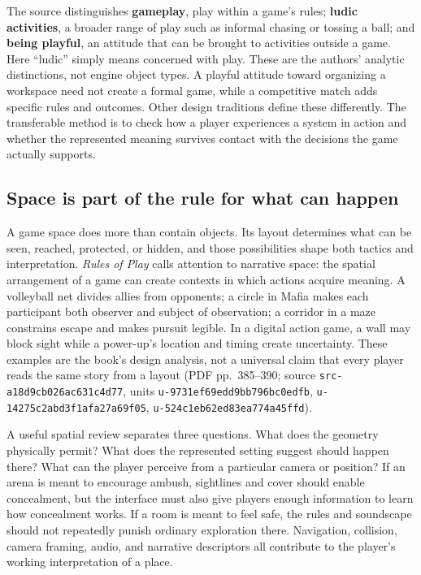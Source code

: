 The source distinguishes \textbf{gameplay}, play within a game's rules; \textbf{ludic activities}, a broader range of play such as informal chasing or tossing a ball; and \textbf{being playful}, an attitude that can be brought to activities outside a game. Here ``ludic'' simply means concerned with play. These are the authors' analytic distinctions, not engine object types. A playful attitude toward organizing a workspace need not create a formal game, while a competitive match adds specific rules and outcomes. Other design traditions define these differently. The transferable method is to check how a player experiences a system in action and whether the represented meaning survives contact with the decisions the game actually supports.

\subsection{Space is part of the rule for what can happen}\label{space-is-part-of-the-rule-for-what-can-happen}

A game space does more than contain objects. Its layout determines what can be seen, reached, protected, or hidden, and those possibilities shape both tactics and interpretation. \emph{Rules of Play} calls attention to narrative space: the spatial arrangement of a game can create contexts in which actions acquire meaning. A volleyball net divides allies from opponents; a circle in Mafia makes each participant both observer and subject of observation; a corridor in a maze constrains escape and makes pursuit legible. In a digital action game, a wall may block sight while a power-up's location and timing create uncertainty. These examples are the book's design analysis, not a universal claim that every player reads the same story from a layout (PDF pp.~385--390; source \texttt{src-a18d9cb026ac631c4d77}, units \texttt{u-9731ef69edd9bb796bc0edfb}, \texttt{u-14275c2abd3f1afa27a69f05}, \texttt{u-524c1eb62ed83ea774a45ffd}).

A useful spatial review separates three questions. What does the geometry physically permit? What does the represented setting suggest should happen there? What can the player perceive from a particular camera or position? If an arena is meant to encourage ambush, sightlines and cover should enable concealment, but the interface must also give players enough information to learn how concealment works. If a room is meant to feel safe, the rules and soundscape should not repeatedly punish ordinary exploration there. Navigation, collision, camera framing, audio, and narrative descriptors all contribute to the player's working interpretation of a place.

